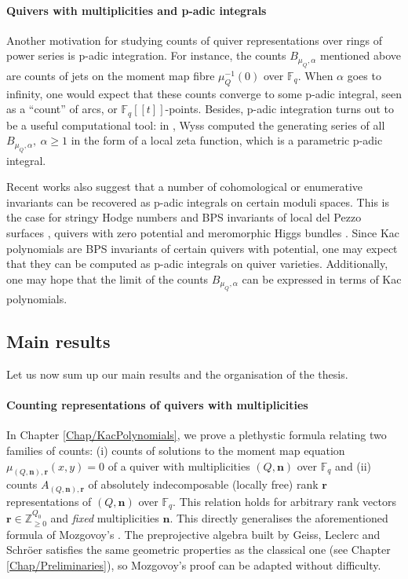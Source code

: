 \documentclass[11pt,english]{article}
\numberwithin{equation}{section}
\numberwithin{figure}{section}
\theoremstyle{definition}
\theoremstyle{plain}
\theoremstyle{remark}
\newcommand\nn{\mathbf{n}}
\newcommand\rr{\mathbf{r}}
\newcommand\ZZ{\mathbb{Z}}
\newcommand\FF{\mathbb{F}}
\begin{document}
\paragraph*{Quivers with multiplicities and p-adic integrals}

Another motivation for studying counts of quiver representations over
rings of power series is p-adic integration. For instance, the counts
$B_{\mu_{Q},\alpha}$ mentioned above are counts of jets on the moment
map fibre $\mu_{Q}^{-1}(0)$ over $\FF_{q}$. When $\alpha$ goes
to infinity, one would expect that these counts converge to some p-adic
integral, seen as a ``count'' of arcs, or $\FF_{q}[[t]]$-points.
Besides, p-adic integration turns out to be a useful computational
tool: in \cite{Wys17b}, Wyss computed the generating series of all
$B_{\mu_{Q},\alpha},\ \alpha\geq1$ in the form of a local zeta function,
which is a parametric p-adic integral.

Recent works also suggest that a number of cohomological or enumerative
invariants can be recovered as p-adic integrals on certain moduli
spaces. This is the case for stringy Hodge numbers \cite{GWZ20a}
and BPS invariants of local del Pezzo surfaces \cite{COW21}, quivers
with zero potential and meromorphic Higgs bundles \cite{GWZ23a,GWZ23b}.
Since Kac polynomials are BPS invariants of certain quivers with potential,
one may expect that they can be computed as p-adic integrals on quiver
varieties. Additionally, one may hope that the limit of the counts
$B_{\mu_{Q},\alpha}$ can be expressed in terms of Kac polynomials.

\subsection*{Main results}

Let us now sum up our main results and the organisation of the thesis.

\paragraph*{Counting representations of quivers with multiplicities}

In Chapter \ref{Chap/KacPolynomials}, we prove a plethystic formula
relating two families of counts: (i) counts of solutions to the moment
map equation $\mu_{(Q,\nn),\rr}(x,y)=0$ of a quiver with multiplicities
$(Q,\nn)$ over $\FF_{q}$ and (ii) counts $A_{(Q,\nn),\rr}$ of absolutely
indecomposable (locally free) rank $\rr$ representations of $(Q,\nn)$
over $\FF_{q}$. This relation holds for arbitrary rank vectors $\rr\in\ZZ_{\geq0}^{Q_{0}}$
and \textit{fixed} multiplicities $\nn$. This directly generalises
the aforementioned formula of Mozgovoy's \cite{Moz11a}. The preprojective
algebra built by Geiss, Leclerc and Schröer satisfies the same geometric
properties as the classical one (see Chapter \ref{Chap/Preliminaries}),
so Mozgovoy's proof can be adapted without difficulty.
\end{document}
